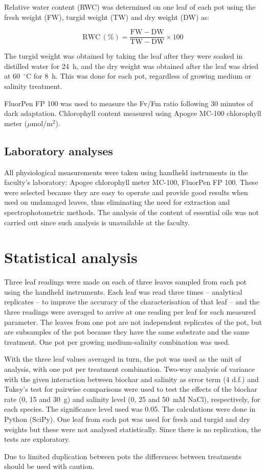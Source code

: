 Relative water content (RWC) was determined on one leaf of each pot using the fresh weight (FW), turgid weight (TW) and dry weight (DW) as:

\begin{equation}
  \mathrm{RWC}\,(\%) = \frac{\mathrm{FW} - \mathrm{DW}}{\mathrm{TW} - \mathrm{DW}} \times 100
  \label{eq:rwc}
\end{equation}

The turgid weight was obtained by taking the leaf after they were soaked in distilled water for 24~h, and the dry weight was obtained after the leaf was dried at 60~$^{\circ}$C for 8~h. This was done for each pot, regardless of growing medium or salinity treatment.

FluorPen FP 100 was used to measure the Fv/Fm ratio following 30 minutes of dark adaptation. Chlorophyll content measured using Apogee MC-100 chlorophyll meter ($\mu$mol/m$^2$).

\subsection{Laboratory analyses}

All physiological measurements were taken using handheld instruments in the faculty's laboratory: Apogee chlorophyll meter MC-100, FluorPen FP 100. These were selected because they are easy to operate and provide good results when used on undamaged leaves, thus eliminating the need for extraction and spectrophotometric methods. The analysis of the content of essential oils was not carried out since such analysis is unavailable at the faculty.

\section{Statistical analysis}

Three leaf readings were made on each of three leaves sampled from each pot using the handheld instruments. Each leaf was read three times – analytical replicates – to improve the accuracy of the characterisation of that leaf – and the three readings were averaged to arrive at one reading per leaf for each measured parameter. The leaves from one pot are not independent replicates of the pot, but are subsamples of the pot because they have the same substrate and the same treatment. One pot per growing medium-salinity combination was used.

With the three leaf values averaged in turn, the pot was used as the unit of analysis, with one pot per treatment combination. Two-way analysis of variance with the given interaction between biochar and salinity as error term (4 d.f.) and Tukey's test for pairwise comparisons were used to test the effects of the biochar rate (0, 15 and 30~g) and salinity level (0, 25 and 50~mM NaCl), respectively, for each species. The significance level used was 0.05. The calculations were done in Python (SciPy). One leaf from each pot was used for fresh and turgid and dry weights but these were not analysed statistically. Since there is no replication, the tests are exploratory.

Due to limited duplication between pots the differences between treatments should be used with caution.
